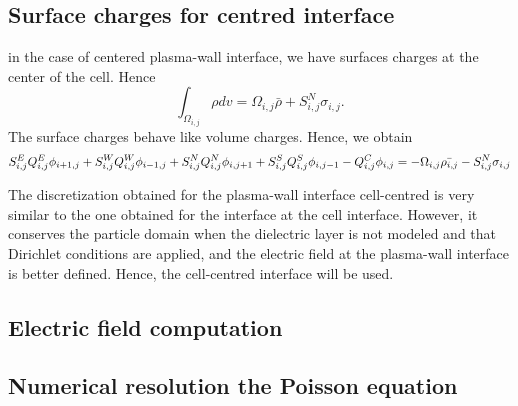   \subsection{Surface charges for centred interface}
    in the case of centered plasma-wall interface, we have surfaces charges at the center of the cell.
    Hence
    \begin{equation}
    \int_{\Omega_{i,j}} \rho dv = \Omega_{i,j}\bar{\rho} + S_{i,j}^N \sigma_{i,j}.
    \end{equation}
    The surface charges behave like volume charges.
    Hence, we obtain
    \begin{equation}
    S^E_{i,j} Q^E_{i,j} \phi_{i+1,j} + S^W_{i,j} Q^W_{i,j} \phi_{i-1,j} + S^N_{i,j} Q^N_{i,j} \phi_{i,j+1} + S^S_{i,j} Q^S_{i,j} \phi_{i,j-1} - Q^C_{i,j} \phi_{i,j} = - \Omega_{i,j} \bar{\rho_{i,j}} - S^N_{i,j} \sigma_{i,j}
    \end{equation}

    The discretization obtained for the plasma-wall interface cell-centred is very similar to the one obtained for the interface at the cell interface.
    However, it conserves the particle domain when the dielectric layer is not modeled and that Dirichlet conditions are applied, and the electric field at the plasma-wall interface is better defined.
    Hence, the cell-centred interface will be used.

    
  \subsection{Electric field computation}
  
  \subsection{Numerical resolution the Poisson equation}
  
  